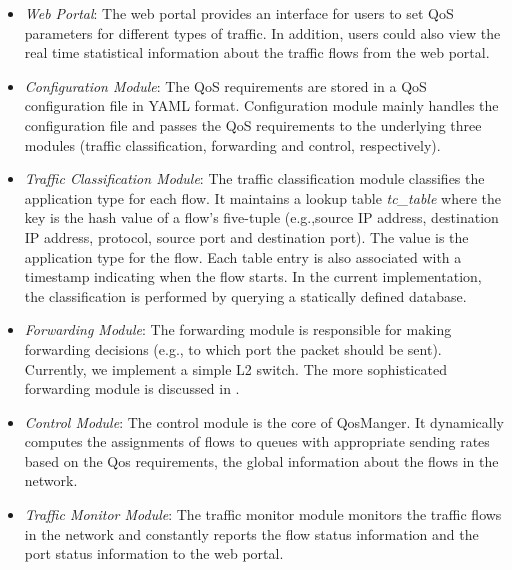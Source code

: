 \begin{itemize}
  \item \emph{Web Portal}: The web portal provides an interface for users to set QoS parameters for
    different types of traffic. In addition, users could also view the real time statistical information
    about the traffic flows from the web portal.
  \item \emph{Configuration Module}: The QoS requirements are stored in a QoS configuration file in YAML
    format. Configuration module mainly handles the configuration file and passes the QoS requirements
    to the underlying three modules (traffic classification, forwarding and control, respectively).
  \item \emph{Traffic Classification Module}: The traffic classification module classifies the application
    type for each flow. It maintains a lookup table \emph{tc\_table} where the key is the hash value of a
    flow's five-tuple (e.g.,source IP address, destination IP address, protocol, source port and destination port).
    The value is the application type for the flow. Each table entry is also associated with a timestamp indicating
    when the flow starts. In the current implementation, the classification is performed by querying a statically
    defined database.
  \item \emph{Forwarding Module}: The forwarding module is responsible for making forwarding decisions (e.g.,
    to which port the packet should be sent). Currently, we implement a simple L2 switch. The more sophisticated
    forwarding module is discussed in .
  \item \emph{Control Module}: The control module is the core of QosManger. It dynamically computes the
    assignments of flows to queues with appropriate sending rates based on the Qos requirements, the global
    information about the flows in the network.
  \item \emph{Traffic Monitor Module}: The traffic monitor module monitors the traffic flows in the network
    and constantly reports the flow status information and the port status information to the web portal.
\end{itemize}

